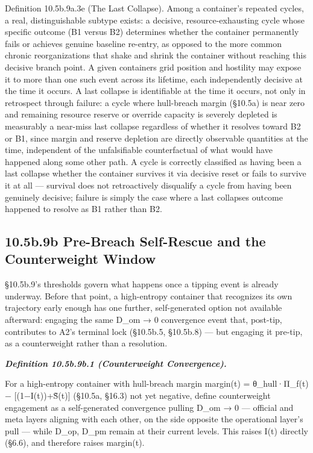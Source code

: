 \documentclass[
]{article}
\begin{document}
Definition 10.5b.9a.3e (The Last Collapse). Among a container's repeated
cycles, a real, distinguishable subtype exists: a decisive,
resource-exhausting cycle whose specific outcome (B1 versus B2)
determines whether the container permanently fails or achieves genuine
baseline re-entry, as opposed to the more common chronic reorganizations
that shake and shrink the container without reaching this decisive
branch point. A given containers grid position and hostility may expose
it to more than one such event across its lifetime, each independently
decisive at the time it occurs. A last collapse is identifiable at the
time it occurs, not only in retrospect through failure: a cycle where
hull-breach margin (§10.5a) is near zero and remaining resource reserve
or override capacity is severely depleted is measurably a near-miss last
collapse regardless of whether it resolves toward B2 or B1, since margin
and reserve depletion are directly observable quantities at the time,
independent of the unfalsifiable counterfactual of what would have
happened along some other path. A cycle is correctly classified as
having been a last collapse whether the container survives it via
decisive reset or fails to survive it at all --- survival does not
retroactively disqualify a cycle from having been genuinely decisive;
failure is simply the case where a last collapses outcome happened to
resolve as B1 rather than B2.

\hypertarget{b.9b-pre-breach-self-rescue-and-the-counterweight-window}{%
\subsection{10.5b.9b Pre-Breach Self-Rescue and the Counterweight
Window}\label{b.9b-pre-breach-self-rescue-and-the-counterweight-window}}

§10.5b.9's thresholds govern what happens once a tipping event is
already underway. Before that point, a high-entropy container that
recognizes its own trajectory early enough has one further,
self-generated option not available afterward: engaging the same D\_om →
0 convergence event that, post-tip, contributes to A2's terminal lock
(§10.5b.5, §10.5b.8) --- but engaging it pre-tip, as a counterweight
rather than a resolution.

\emph{\textbf{Definition 10.5b.9b.1 (Counterweight Convergence).}}

For a high-entropy container with hull-breach margin margin(t) =
θ\_hull·Π\_f(t) − {[}(1−I(t))+S̃(t){]} (§10.5a, §16.3) not yet negative,
define counterweight engagement as a self-generated convergence pulling
D\_om → 0 --- official and meta layers aligning with each other, on the
side opposite the operational layer's pull --- while D\_op, D\_pm remain
at their current levels. This raises I(t) directly (§6.6), and therefore
raises margin(t).
\end{document}
